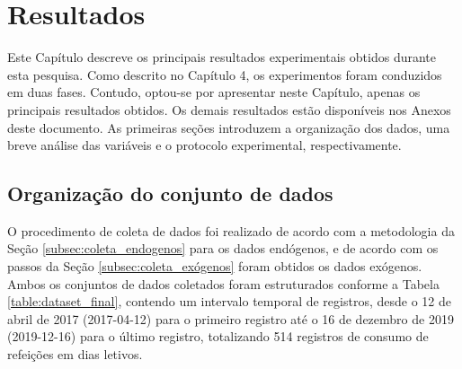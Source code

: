 \chapter{Resultados} \label{cap:resultados}



Este Capítulo descreve os principais resultados experimentais obtidos durante esta pesquisa. Como descrito no Capítulo 4, os experimentos foram conduzidos em duas fases. Contudo, optou-se por apresentar neste Capítulo, apenas os principais resultados obtidos. Os demais resultados estão disponíveis nos Anexos deste documento. As primeiras seções introduzem a organização dos dados, uma breve análise das variáveis e o protocolo experimental, respectivamente.

\section{Organização do conjunto de dados}

    O procedimento de coleta de dados foi realizado de acordo com a metodologia da Seção \ref{subsec:coleta_endogenos} para os dados endógenos, e de acordo com os passos da Seção \ref{subsec:coleta_exógenos} foram obtidos os dados exógenos.
    Ambos os conjuntos de dados coletados foram estruturados conforme a Tabela \ref{table:dataset_final}, contendo um intervalo temporal de registros, desde o 12 de abril de 2017 (2017-04-12)  para o primeiro registro até o 16 de dezembro de 2019  (2019-12-16)  para o último registro, totalizando 514 registros de consumo de refeições em dias letivos.
    
